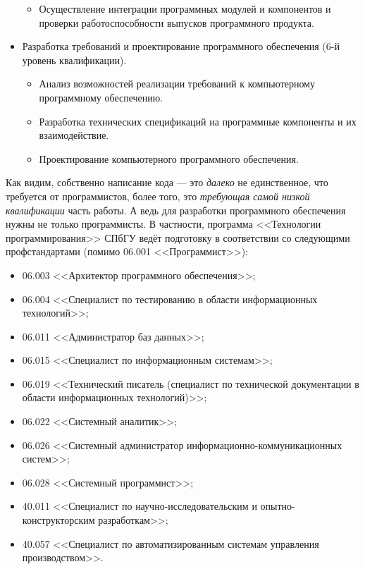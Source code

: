 \documentclass{../../text-style}
\begin{document}
\begin{itemize}
\begin{itemize}
        \item Осуществление интеграции программных модулей и компонентов и проверки работоспособности выпусков программного продукта.
    \end{itemize}
    \item Разработка требований и проектирование программного обеспечения (6-й уровень квалификации).
    \begin{itemize}
        \item Анализ возможностей реализации требований к компьютерному программному обеспечению.
        \item Разработка технических спецификаций на программные компоненты и их взаимодействие.
        \item Проектирование компьютерного программного обеспечения.
    \end{itemize}
\end{itemize}

Как видим, собственно написание кода --- это \emph{далеко} не единственное, что требуется от программистов, более того, это \emph{требующая самой низкой квалификации} часть работы. А ведь для разработки программного обеспечения нужны не только программисты. В частности, программа <<Технологии программирования>> СПбГУ ведёт подготовку в соответствии со следующими профстандартами (помимо 06.001 <<Программист>>): 

\begin{itemize}
    \item 06.003 <<Архитектор программного обеспечения>>;
    \item 06.004 <<Специалист по тестированию в области информационных технологий>>;
    \item 06.011 <<Администратор баз данных>>;
    \item 06.015 <<Специалист по информационным системам>>;
    \item 06.019 <<Технический писатель (специалист по технической документации в области информационных технологий)>>;
    \item 06.022 <<Системный аналитик>>;
    \item 06.026 <<Системный администратор информационно-коммуникационных систем>>;
    \item 06.028 <<Системный программист>>;
    \item 40.011 <<Специалист по научно-исследовательским и опытно-конструкторским разработкам>>;
    \item 40.057 <<Специалист по автоматизированным системам управления производством>>.
\end{itemize}
\end{document}
